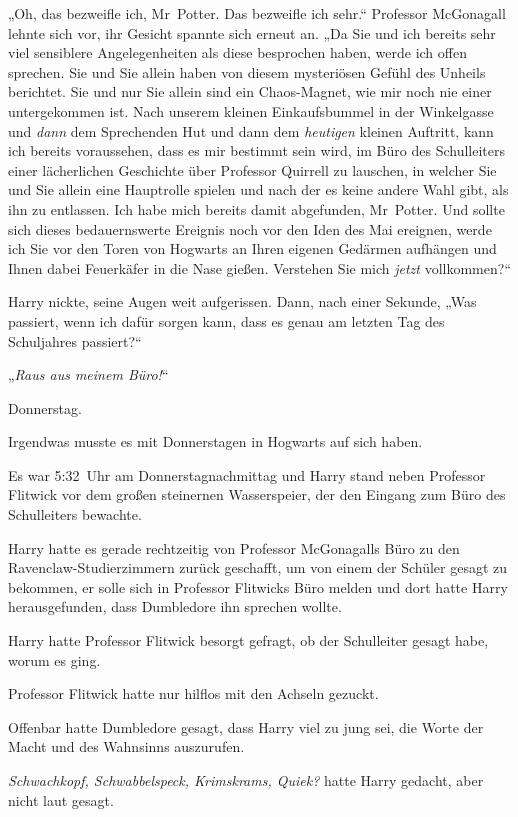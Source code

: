 {„Oh, das bezweifle ich, Mr~Potter. Das bezweifle ich sehr.“ Professor McGonagall lehnte sich vor, ihr Gesicht spannte sich erneut an. „Da Sie und ich bereits sehr viel sensiblere Angelegenheiten als diese besprochen haben, werde ich offen sprechen. Sie und Sie allein haben von diesem mysteriösen Gefühl des Unheils berichtet. Sie und nur Sie allein sind ein Chaos-Magnet, wie mir noch nie einer untergekommen ist. Nach unserem kleinen Einkaufsbummel in der Winkelgasse und \emph{dann} dem Sprechenden Hut und dann dem \emph{heutigen} kleinen Auftritt, kann ich bereits voraussehen, dass es mir bestimmt sein wird, im Büro des Schulleiters einer lächerlichen Geschichte über Professor Quirrell zu lauschen, in welcher Sie und Sie allein eine Hauptrolle spielen und nach der es keine andere Wahl gibt, als ihn zu entlassen. Ich habe mich bereits damit abgefunden, Mr~Potter. Und sollte sich dieses bedauernswerte Ereignis noch vor den Iden des Mai ereignen, werde ich Sie vor den Toren von Hogwarts an Ihren eigenen Gedärmen aufhängen und Ihnen dabei Feuerkäfer in die Nase gießen. Verstehen Sie mich \emph{jetzt} vollkommen?“

Harry nickte, seine Augen weit aufgerissen. Dann, nach einer Sekunde, „Was passiert, wenn ich dafür sorgen kann, dass es genau am letzten Tag des Schuljahres passiert?“

„\emph{Raus aus meinem Büro!}“

\later

Donnerstag.

Irgendwas musste es mit Donnerstagen in Hogwarts auf sich haben.

Es war 5:32~Uhr am Donnerstagnachmittag und Harry stand neben Professor Flitwick vor dem großen steinernen Wasserspeier, der den Eingang zum Büro des Schulleiters bewachte.

Harry hatte es gerade rechtzeitig von Professor McGonagalls Büro zu den Ravenclaw-Studierzimmern zurück geschafft, um von einem der Schüler gesagt zu bekommen, er solle sich in Professor Flitwicks Büro melden und dort hatte Harry herausgefunden, dass Dumbledore ihn sprechen wollte.

Harry hatte Professor Flitwick besorgt gefragt, ob der Schulleiter gesagt habe, worum es ging.

Professor Flitwick hatte nur hilflos mit den Achseln gezuckt.

Offenbar hatte Dumbledore gesagt, dass Harry viel zu jung sei, die Worte der Macht und des Wahnsinns auszurufen.

\emph{Schwachkopf, Schwabbelspeck, Krimskrams, Quiek?} hatte Harry gedacht, aber nicht laut gesagt.

}
